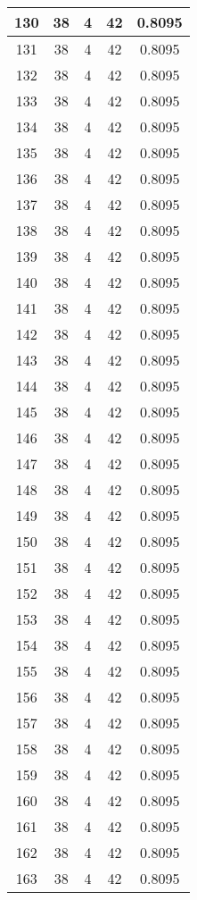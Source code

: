\documentclass[letterpaper, 12pt]{article}
\begin{document}
\begin{longtable}{|c|c|c|c|c|}
\hline
130 & 38 & 4 & 42 & 0.8095 \\
\hline
131 & 38 & 4 & 42 & 0.8095 \\
\hline
132 & 38 & 4 & 42 & 0.8095 \\
\hline
133 & 38 & 4 & 42 & 0.8095 \\
\hline
134 & 38 & 4 & 42 & 0.8095 \\
\hline
135 & 38 & 4 & 42 & 0.8095 \\
\hline
136 & 38 & 4 & 42 & 0.8095 \\
\hline
137 & 38 & 4 & 42 & 0.8095 \\
\hline
138 & 38 & 4 & 42 & 0.8095 \\
\hline
139 & 38 & 4 & 42 & 0.8095 \\
\hline
140 & 38 & 4 & 42 & 0.8095 \\
\hline
141 & 38 & 4 & 42 & 0.8095 \\
\hline
142 & 38 & 4 & 42 & 0.8095 \\
\hline
143 & 38 & 4 & 42 & 0.8095 \\
\hline
144 & 38 & 4 & 42 & 0.8095 \\
\hline
145 & 38 & 4 & 42 & 0.8095 \\
\hline
146 & 38 & 4 & 42 & 0.8095 \\
\hline
147 & 38 & 4 & 42 & 0.8095 \\
\hline
148 & 38 & 4 & 42 & 0.8095 \\
\hline
149 & 38 & 4 & 42 & 0.8095 \\
\hline
150 & 38 & 4 & 42 & 0.8095 \\
\hline
151 & 38 & 4 & 42 & 0.8095 \\
\hline
152 & 38 & 4 & 42 & 0.8095 \\
\hline
153 & 38 & 4 & 42 & 0.8095 \\
\hline
154 & 38 & 4 & 42 & 0.8095 \\
\hline
155 & 38 & 4 & 42 & 0.8095 \\
\hline
156 & 38 & 4 & 42 & 0.8095 \\
\hline
157 & 38 & 4 & 42 & 0.8095 \\
\hline
158 & 38 & 4 & 42 & 0.8095 \\
\hline
159 & 38 & 4 & 42 & 0.8095 \\
\hline
160 & 38 & 4 & 42 & 0.8095 \\
\hline
161 & 38 & 4 & 42 & 0.8095 \\
\hline
162 & 38 & 4 & 42 & 0.8095 \\
\hline
163 & 38 & 4 & 42 & 0.8095 \\

\end{longtable}
\end{document}

